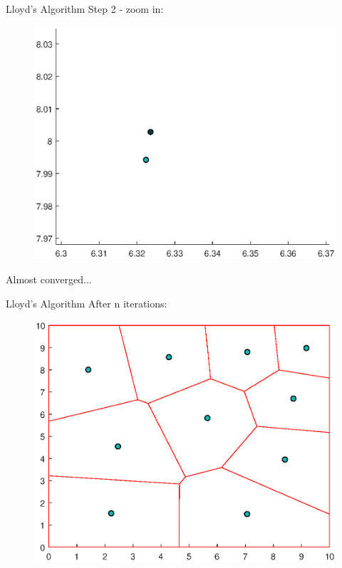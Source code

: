 \documentclass[t]{beamer}
\begin{document}
\begin{frame}[label=lloydsalg4]{Lloyd's Algorithm}
Step 2 - zoom in:
\begin{figure}
\centering
\includegraphics[scale=0.4]{background/cvt-calc-step2-zoom.eps}
\end{figure}
Almost converged...
\end{frame}
\begin{frame}[label=lloydsalg5]{Lloyd's Algorithm}
After n iterations:
\begin{figure}
\centering
\includegraphics[scale=0.4]{background/cvt-calc-stepn.eps}
\end{figure}
\end{frame}
\end{document}
